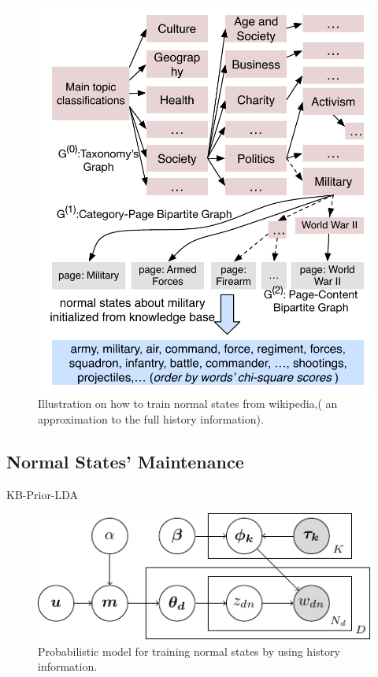 \documentclass[conference,compsoc]{IEEEtran}
\begin{document}

\begin{figure}
    \centering
    \includegraphics[width=.85\columnwidth]{img/initializationExample.pdf}  
    \caption{Illustration on how to train normal states from wikipedia,( an approximation to the full history information).}
    \label{fig:modelDesc}
\end{figure}


\subsection{Normal States' Maintenance}
KB-Prior-LDA
\begin{figure}[t]
    \centering
    \includegraphics[width=0.75\columnwidth]{model/lda_tikz.pdf}
    \caption{Probabilistic model for training normal states by using history information.}
    \label{fig:cnn}
\end{figure}
\end{document}

